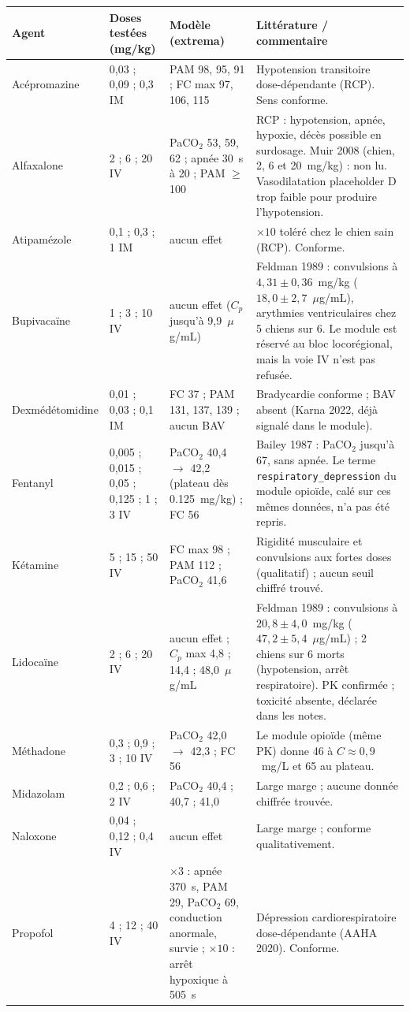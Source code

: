 \documentclass[10pt,a4paper]{article}
\newcommand{\cmd}[1]{\texttt{#1}}
\begin{document}
\begin{longtable}{P{2.2cm}P{2.6cm}P{5.3cm}P{5.2cm}}
\toprule
Agent & Doses testées (mg/kg) & Modèle (extrema) & Littérature / commentaire\\
\midrule
\endhead
Acépromazine & 0,03 ; 0,09 ; 0,3 IM & PAM 98, 95, 91 ; FC max 97, 106, 115 & Hypotension transitoire dose-dépendante (RCP). Sens conforme.\\
Alfaxalone & 2 ; 6 ; 20 IV & PaCO$_2$ 53, 59, 62 ; apnée \SI{30}{s} à 20 ; PAM $\geq$ 100 & RCP : hypotension, apnée, hypoxie, décès possible en surdosage. Muir 2008 (chien, 2, 6 et \SI{20}{mg/kg}) : non lu. Vasodilatation placeholder D trop faible pour produire l'hypotension.\\
Atipamézole & 0,1 ; 0,3 ; 1 IM & aucun effet & $\times 10$ toléré chez le chien sain (RCP). Conforme.\\
Bupivacaïne & 1 ; 3 ; 10 IV & aucun effet ($C_p$ jusqu'à 9,9~$\mu$g/mL) & Feldman 1989 : convulsions à $4{,}31 \pm 0{,}36$~mg/kg ($18{,}0 \pm 2{,}7$~$\mu$g/mL), arythmies ventriculaires chez 5 chiens sur 6. Le module est réservé au bloc locorégional, mais la voie IV n'est pas refusée.\\
Dexmédétomidine & 0,01 ; 0,03 ; 0,1 IM & FC 37 ; PAM 131, 137, 139 ; aucun BAV & Bradycardie conforme ; BAV absent (Karna 2022, déjà signalé dans le module).\\
Fentanyl & 0,005 ; 0,015 ; 0,05 ; 0,125 ; 1 ; 3 IV & PaCO$_2$ 40,4 $\rightarrow$ 42,2 (plateau dès \SI{0,125}{mg/kg}) ; FC 56 & Bailey 1987 : PaCO$_2$ jusqu'à 67, sans apnée. Le terme \cmd{respiratory\_depression} du module opioïde, calé sur ces mêmes données, n'a pas été repris.\\
Kétamine & 5 ; 15 ; 50 IV & FC max 98 ; PAM 112 ; PaCO$_2$ 41,6 & Rigidité musculaire et convulsions aux fortes doses (qualitatif) ; aucun seuil chiffré trouvé.\\
Lidocaïne & 2 ; 6 ; 20 IV & aucun effet ; $C_p$ max 4,8 ; 14,4 ; 48,0~$\mu$g/mL & Feldman 1989 : convulsions à $20{,}8 \pm 4{,}0$~mg/kg ($47{,}2 \pm 5{,}4$~$\mu$g/mL) ; 2 chiens sur 6 morts (hypotension, arrêt respiratoire). PK confirmée ; toxicité absente, déclarée dans les notes.\\
Méthadone & 0,3 ; 0,9 ; 3 ; 10 IV & PaCO$_2$ 42,0 $\rightarrow$ 42,3 ; FC 56 & Le module opioïde (même PK) donne 46 à $C \approx 0{,}9$~mg/L et 65 au plateau.\\
Midazolam & 0,2 ; 0,6 ; 2 IV & PaCO$_2$ 40,4 ; 40,7 ; 41,0 & Large marge ; aucune donnée chiffrée trouvée.\\
Naloxone & 0,04 ; 0,12 ; 0,4 IV & aucun effet & Large marge ; conforme qualitativement.\\
Propofol & 4 ; 12 ; 40 IV & $\times 3$ : apnée \SI{370}{s}, PAM 29, PaCO$_2$ 69, conduction anormale, survie ; $\times 10$ : arrêt hypoxique à \SI{505}{s} & Dépression cardiorespiratoire dose-dépendante (AAHA 2020). Conforme.\\
\bottomrule
\end{longtable}
\end{document}

